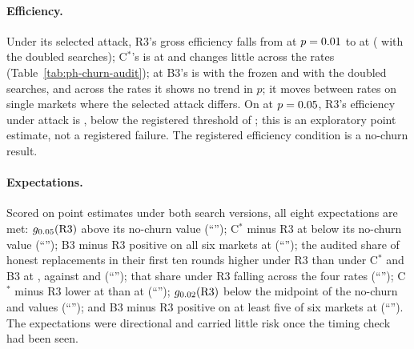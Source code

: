 \documentclass[11pt]{article}
\begin{document}
\paragraph{Efficiency.} Under its selected attack, R3's gross efficiency falls from  at $p = 0.01$ to  at  ( with the doubled searches); C$^*$'s is  at  and changes little across the rates (Table~\ref{tab:ph-churn-audit}); at  B3's is  with the frozen and  with the doubled searches, and across the rates it shows no trend in $p$; it moves between rates on single markets where the selected attack differs. On  at $p = 0.05$, R3's efficiency under attack is , below the registered threshold of ; this is an exploratory point estimate, not a registered failure. The registered efficiency condition is a no-churn result.

\paragraph{Expectations.} Scored on point estimates under both search versions, all eight expectations are met: $g_{0.05}(\mathrm{R3})$ above its no-churn value (``''); C$^*$ minus R3 at  below its no-churn value (``''); B3 minus R3 positive on all six markets at  (``''); the audited share of honest replacements in their first ten rounds higher under R3 than under C$^*$ and B3 at ,  against  and  (``''); that share under R3 falling across the four rates (``''); C$^*$ minus R3 lower at  than at  (``''); $g_{0.02}(\mathrm{R3})$ below the midpoint of the no-churn and  values (``''); and B3 minus R3 positive on at least five of six markets at  (``''). The expectations were directional and carried little risk once the timing check had been seen.
\end{document}
